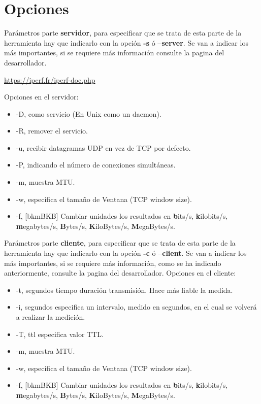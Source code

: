\section{Opciones}
Parámetros parte \textbf{servidor}, para especificar que se trata de esta parte de la herramienta hay que indicarlo con la opción \textbf{-s} ó \textbf{--server}. Se van a indicar los más importantes, si se requiere más información consulte la pagina del desarrollador.
\begin{center}
    \url{https://iperf.fr/iperf-doc.php}
\end{center}
\newpage
Opciones en el servidor:
\begin{itemize}
    \item -D, como servicio (En Unix como un daemon).
    \item -R, remover el servicio.
    \item -u, recibir datagramas UDP en vez de TCP por defecto.
    \item -P, indicando el número de conexiones simultáneas.
    \item -m, muestra MTU.
    \item -w, especifica el tamaño de Ventana (TCP window size).
    \item -f,   [bkmBKB] Cambiar unidades los resultados en \textbf{b}its/s, \textbf{k}ilobits/s, \textbf{m}egabytes/s, \textbf{B}ytes/s, \textbf{K}iloBytes/s, \textbf{M}egaBytes/s.
\end{itemize}
Parámetros parte \textbf{cliente}, para especificar que se trata de esta parte de la herramienta hay que indicarlo con la opción \textbf{-c} ó \textbf{--client}. Se van a indicar los más importantes, si se requiere más información, como se ha indicado anteriormente, consulte la pagina del desarrollador.\newline
\newline
Opciones en el cliente:
\begin{itemize}
    \item -t, segundos tiempo duración transmisión. Hace más fiable la medida.
    \item -i, segundos especifica un intervalo, medido en segundos, en el cual se volverá a realizar la medición.
    \item -T, ttl especifica valor TTL.
    \item -m, muestra MTU.
    \item -w, especifica el tamaño de Ventana (TCP window size).
    \item -f,   [bkmBKB] Cambiar unidades los resultados en \textbf{b}its/s, \textbf{k}ilobits/s, \textbf{m}egabytes/s, \textbf{B}ytes/s, \textbf{K}iloBytes/s, \textbf{M}egaBytes/s.
\end{itemize}
